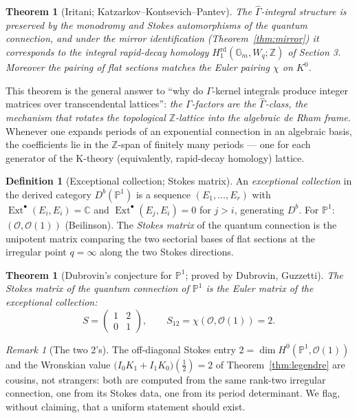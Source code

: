 \documentclass[11pt]{article}
\newtheorem{theorem}[proposition]{Theorem}
\theoremstyle{definition}
\newtheorem{definition}[proposition]{Definition}
\theoremstyle{remark}
\newtheorem{remark}[proposition]{Remark}
\newcommand{\C}{\mathbb{C}}
\newcommand{\Z}{\mathbb{Z}}
\newcommand{\Gm}{\mathbb{G}_m}
\newcommand{\PP}{\mathbb{P}}
\newcommand{\rd}{\mathrm{rd}}
\newcommand{\G}{\Gamma}
\begin{document}
\begin{theorem}[Iritani; Katzarkov--Kontsevich--Pantev]
\label{thm:iritani}
The $\widehat\G$-integral structure is preserved by the monodromy
and Stokes automorphisms of the quantum connection, and under the
mirror identification (Theorem~\ref{thm:mirror}) it corresponds to
the integral rapid-decay homology $H_1^{\rd}(\Gm, W_q; \Z)$ of
Section 3. Moreover the pairing of flat sections matches the Euler
pairing $\chi$ on $K^0$.
\end{theorem}

This theorem is the general answer to ``why do $\G$-kernel
integrals produce integer matrices over transcendental lattices'':
\emph{the $\G$-factors are the $\widehat\G$-class, the mechanism
that rotates the topological $\Z$-lattice into the algebraic de
Rham frame}. Whenever one expands periods of an exponential
connection in an algebraic basis, the coefficients lie in the
$\Z$-span of finitely many periods --- one for each generator of
the K-theory (equivalently, rapid-decay homology) lattice.

\begin{definition}[Exceptional collection; Stokes matrix]
An \emph{exceptional collection} in the derived category
$D^b(\PP^1)$ is a sequence $(E_1, \dots, E_r)$ with
$\operatorname{Ext}^\bullet(E_i, E_i) = \C$ and
$\operatorname{Ext}^\bullet(E_j, E_i) = 0$ for $j > i$, generating
$D^b$. For $\PP^1$: $(\mathcal O, \mathcal O(1))$ (Beilinson). The
\emph{Stokes matrix} of the quantum connection is the unipotent
matrix comparing the two sectorial bases of flat sections at the
irregular point $q = \infty$ along the two Stokes directions.
\end{definition}

\begin{theorem}[Dubrovin's conjecture for $\PP^1$; proved by
Dubrovin, Guzzetti]
The Stokes matrix of the quantum connection of $\PP^1$ is the
Euler matrix of the exceptional collection:
\[
  S = \begin{pmatrix} 1 & 2 \\ 0 & 1 \end{pmatrix},
  \qquad S_{12} = \chi(\mathcal O, \mathcal O(1)) = 2 .
\]
\end{theorem}

\begin{remark}[The two 2's]
The off-diagonal Stokes entry $2 = \dim H^0(\PP^1, \mathcal O(1))$
and the Wronskian value $\bigl(I_0K_1 + I_1K_0\bigr)(\tfrac12) = 2$
of Theorem~\ref{thm:legendre} are cousins, not strangers: both are
computed from the same rank-two irregular connection, one from its
Stokes data, one from its period determinant. We flag, without
claiming, that a uniform statement should exist.
\end{remark}
\end{document}
